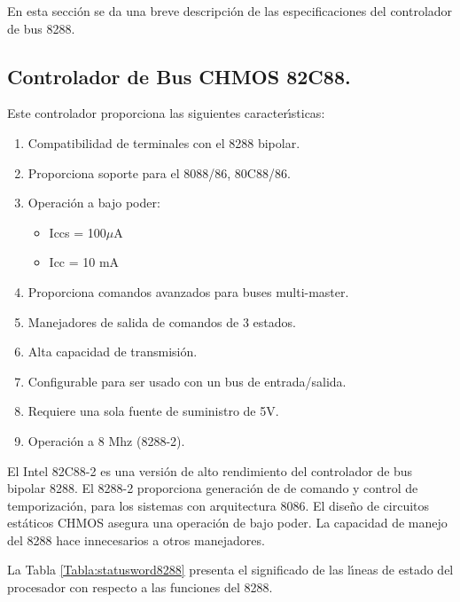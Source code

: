 En esta secci\'on se da una breve descripci\'on de las especificaciones del controlador de bus %
8288.


\subsection{Controlador de Bus CHMOS 82C88.}
\label{Subsection:cbus8288}

Este controlador proporciona las siguientes caracter\'{\i}sticas:

\begin{enumerate}
\item Compatibilidad de terminales con el 8288 bipolar.
\item Proporciona soporte para el 8088/86, 80C88/86.
\item Operaci\'on a bajo poder:
\begin{itemize}
\item Iccs = 100$\mu$A
\item Icc = 10 mA
\end{itemize}
\item Proporciona comandos avanzados para buses multi-master.
\item Manejadores de salida de comandos de 3 estados.
\item Alta capacidad de transmisi\'on.
\item Configurable para ser usado con un bus de entrada/salida.
\item Requiere una sola fuente de suministro de 5V.
\item Operaci\'on a 8 Mhz (8288-2).
\end{enumerate}

El Intel 82C88-2 es una versi\'on de alto rendimiento del controlador de bus bipolar 8288. El %
8288-2 proporciona generaci\'on de de comando y control de temporizaci\'on, para los sistemas %
con arquitectura 8086. El dise\~no de circuitos est\'aticos CHMOS asegura una operaci\'on de %
bajo poder. La capacidad de manejo del 8288 hace innecesarios a otros manejadores.

La Tabla \ref{Tabla:statusword8288} presenta el significado de las l\'{\i}neas de estado del %
procesador con respecto a las funciones del 8288.

